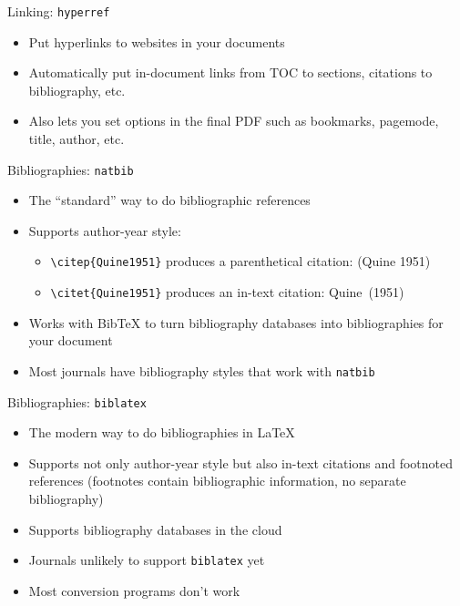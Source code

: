 \begin{frame}{Linking: \texttt{hyperref}}

\begin{itemize}
\item Put hyperlinks to websites in your documents
\item Automatically put in-document links from TOC to sections,
  citations to bibliography, etc.
\item Also lets you set options in the final PDF such as bookmarks,
  pagemode, title, author, etc.
\end{itemize}

\end{frame}

\begin{frame}[fragile]{Bibliographies: \texttt{natbib}}

\begin{itemize}
\item The ``standard'' way to do bibliographic references
\item Supports author-year style:
\begin{itemize}
\item \verb+\citep{Quine1951}+ produces a parenthetical citation: (Quine 1951)
\item \verb+\citet{Quine1951}+ produces an in-text citation: Quine~(1951)
\end{itemize}
\item Works with Bib\TeX{} to turn bibliography databases into
  bibliographies for your document
\item Most journals have bibliography styles that work with \texttt{natbib} 
\end{itemize}

\end{frame}

\begin{frame}{Bibliographies: \texttt{biblatex}}

\begin{itemize}
\item The modern way to do bibliographies in \LaTeX
\item Supports not only author-year style but also in-text citations
  and footnoted references (footnotes contain bibliographic
  information, no separate bibliography)
\item Supports bibliography databases in the cloud
\item Journals unlikely to support \texttt{biblatex} yet
\item Most conversion programs don't work 
\end{itemize}

\end{frame}

